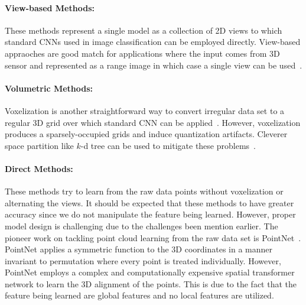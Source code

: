 \paragraph{View-based Methods:}
These methods represent a single model as a collection of 2D views to which standard CNNs used in image classification can be employed directly. View-based appraoches are good match for applications where the input comes from 3D sensor and represented as a range image in which case a single view can be used~\citep{wei2016dense}. 

\paragraph{Volumetric Methods:}
Voxelization is another straightforward way to convert irregular data set to a regular 3D grid over which standard CNN can be applied~\citep{maturana2015voxnet}. However, voxelization produces a sparsely-occupied grids and induce quantization artifacts. Cleverer space partition like $k$-d tree can be used to mitigate these problems~\citep{klokov2017escape}.
\paragraph{Direct Methods:}
These methods try to learn from the raw data points without voxelization or alternating the views. It should be expected that these methods to have greater accuracy since we do not manipulate the feature being learned. However, proper model design is challenging due to the challenges been mention earlier. The pioneer work on tackling point cloud learning from the raw data set is PointNet~\citep{pointnet}. PointNet applies a symmetric function to the 3D coordinates in a manner invariant to permutation where every point is treated individually. However, PointNet employs a complex and computationally expensive spatial transformer network to learn the 3D alignment of the points. This is due to the fact that the feature being learned are global features and no local features are utilized.  